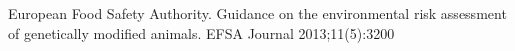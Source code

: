 \documentclass[preprint,authoryear,12pt]{elsarticle}
\begin{document}






European Food Safety Authority. Guidance on the environmental risk assessment of genetically modified animals. EFSA Journal 2013;11(5):3200




\end{document}
